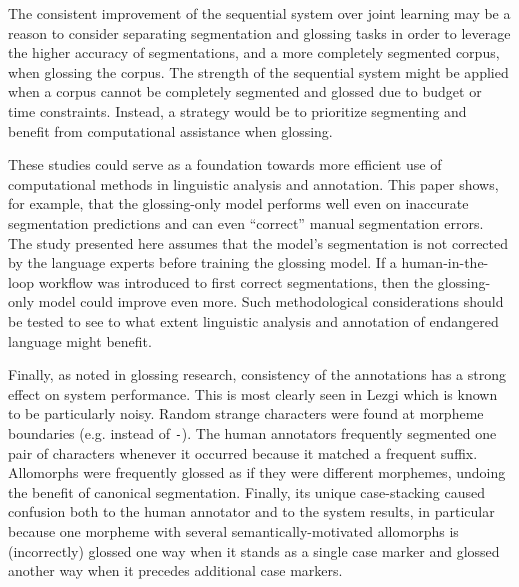 The consistent improvement of the sequential system over joint learning may be a reason to consider separating segmentation and glossing tasks in order to leverage the higher accuracy of segmentations, and a more completely segmented corpus, when glossing the corpus. 
The strength of the sequential system might be applied when a corpus cannot be completely segmented and glossed due to budget or time constraints. Instead, a strategy would be to prioritize segmenting and benefit from computational assistance when glossing. 

These studies could serve as a foundation towards more efficient use of computational methods in linguistic analysis and annotation. This paper shows, for example, that the glossing-only model performs well even on inaccurate segmentation predictions and can even ``correct'' manual segmentation errors. The study presented here assumes that the model's segmentation is not corrected by the language experts before training the glossing model. If a human-in-the-loop workflow was introduced to first correct segmentations, then the glossing-only model could improve even more. Such methodological considerations should be tested to see to what extent linguistic analysis and annotation of endangered language might benefit.

Finally, as \citet{mcmillan-major_automating_2020} noted in glossing research, consistency of the annotations has a strong effect on system performance. This is most clearly seen in Lezgi which is known to be particularly noisy. Random strange characters were found at morpheme boundaries (e.g. {\tt *} instead of  {\tt -}). The human annotators frequently segmented one pair of characters whenever it occurred because it matched a frequent suffix. Allomorphs were frequently glossed as if they were different morphemes, undoing the benefit of canonical segmentation. Finally, its unique case-stacking caused confusion both to the human annotator and to the system results, in particular because one morpheme with several semantically-motivated allomorphs is (incorrectly) glossed one way when it stands as a single case marker and glossed another way when it precedes additional case markers.


